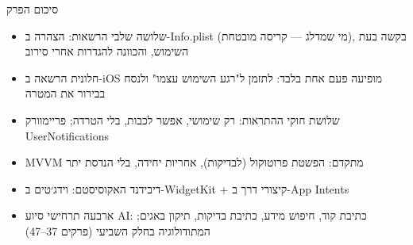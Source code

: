 \begin{tcbsummary}{סיכום הפרק}
\begin{itemize}
  \item שלושה שלבי הרשאות: הצהרה ב-Info.plist (מי שמדלג — קריסה מובטחת), בקשה בעת השימוש, והכוונה להגדרות אחרי סירוב
  \item חלונית הרשאה ב-iOS מופיעה פעם אחת בלבד: לתזמן ל"רגע השימוש עצמו" ולנסח בבירור את המטרה
  \item שלושת חוקי ההתראות: רק שימושי, אפשר לכבות, בלי הטרדה; פריימוורק UserNotifications
  \item MVVM מתקדם: הפשטת פרוטוקול (לבדיקות), אחריות יחידה, בלי הנדסת יתר
  \item דיבידנד האקוסיסטם: וידג׳טים ב-WidgetKit + קיצורי דרך ב-App Intents
  \item ארבעה תרחישי סיוע AI: כתיבת קוד, חיפוש מידע, כתיבת בדיקות, תיקון באגים; המתודולוגיה בחלק השביעי (פרקים 37–47)
\end{itemize}

\end{tcbsummary}
